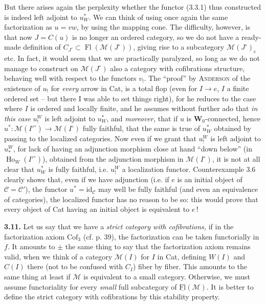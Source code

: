 \documentclass[11pt]{article}
\newcommand{\printedpage}[1]{\marginpar{\footnotesize p.~#1}}
\newcommand{\msp}[1]{\marginpar{\footnotesize [#1]}}
\newcommand{\Fl}{\operatorname{Fl}}
\newcommand{\Ho}{\operatorname{Ho}}
\newcommand{\id}{\mathrm{id}}
\newcommand{\M}{\mathcal{M}}
\begin{document}
\msp{page 67}
But there arises again the perplexity whether the functor (3.3.1) thus constructed is indeed left adjoint to $u_W^*$. We can think of using once again the same factorization as $u = vw$, by
\printedpage{33}
using the mapping cone. The difficulty, however, is that now $J = C(u)$ is no longer an ordered category, so we do not have a ready-made definition of $C_{J^\circ}\subset\Fl(\M(J^\circ))$, giving rise to a subcategory $\M(J^\circ)_{\mathrm{c}}$ etc. In fact, it would seem that we are practically paralyzed, so long as we do not manage to construct on $\M(J^\circ)$ also a category with cofibrations structure, behaving well with respect to the functors $v_!$. The %
``proof'' by \textsc{Anderson} of the existence of $u_!$ for \textit{every} arrow in Cat, is a total flop (even for $I\longrightarrow e$, $I$ a finite ordered set – but there I was able to set things right), for he reduces to the case where $I$ is ordered and locally finite, and he
\msp{page 68}
assumes without further ado that \textit{in this case} $u_!^W$ is left adjoint to $u_W^*$, and \textit{moreover,} that if $u$ is $\mathbf{W}_0$-connected, hence $u^* : \M(I'^\circ)\longrightarrow\M(I^\circ)$ fully faithful, that the same is true of $u_W^*$ obtained by passing to the localized categories. Now even if we grant that $u_!^W$ is left adjoint to
$u_*^W$, for lack of having an adjunction morphism close at hand ``down below'' (in $\Ho_W(I'^\circ)$), %
obtained from the adjunction morphism in $\M(I^\circ)$, it is not at all clear that $u_W^*$ is fully faithful, i.e. $u_!^W$ a localization functor. Counterexample 3.6 clearly shows that, even if we have adjunction (i.e. if $e$ is an initial object of $\mathcal{C} = \mathcal{C}'$), the functor $u^* = \id_{\mathcal{C}}$ may well be fully faithful (and even an equivalence of categories), the localized functor has no reason to be so: this would prove that every object of Cat having an initial object %
is equivalent to $e$\,!

\msp{page 69}
\textbf{3.11.} Let us say that we have a \textit{strict category with cofibrations,} if in the factorization axiom $\mathrm{Cof}_3$ (cf. p. 39), the factorization can be taken functorially in $f$. It amounts to $\pm$ the same thing to say that the factorization axiom remains valid, when we think of a category $\M(I)$ for $I$ in Cat, defining $W(I)$ and $C(I)$ there (not to be confused with $C_I$) fiber by fiber. This amounts to the same thing at least if $\M$ is equivalent to a small category. Otherwise, we must assume functoriality for every \textit{small} full subcategory of $\underline{\mathrm{Fl}}(\M)$. It is better to define the strict category with cofibrations by this stability property.
\end{document}
